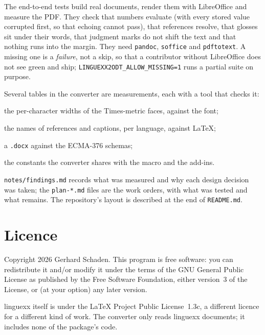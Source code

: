 \documentclass[11pt,a4paper]{article}
\newcommand{\file}[1]{\texttt{#1}}
\newcommand{\pkg}[1]{\textsf{#1}}
\begin{document}
The end-to-end tests build real documents, render them with LibreOffice and
measure the PDF. They check that numbers evaluate (with every stored value
corrupted first, so that echoing cannot pass), that references resolve, that
glosses sit under their words, that judgment marks do not shift the text and
that nothing runs into the margin. They need \texttt{pandoc}, \texttt{soffice}
and \texttt{pdftotext}. A missing one is a \emph{failure}, not a skip, so that
a contributor without LibreOffice does not see green and ship;
\texttt{LINGUEXX2ODT\_ALLOW\_MISSING=1} runs a partial suite on purpose.

Several tables in the converter are measurements, each with a tool that checks
it:
\begin{description}[style=sameline,leftmargin=1.5em,nosep]
\item[\file{tools/measure\_advances.py}] the per-character widths of the
  Times-metric faces, against the font;
\item[\file{tools/measure\_names.py}] the names of references and captions,
  per language, against \LaTeX{};
\item[\file{tools/validate\_docx.py}] a \file{.docx} against the ECMA-376
  schemas;
\item[\file{tools/sync\_macro.py}] the constants the converter shares with the
  macro and the add-ins.
\end{description}
\file{notes/findings.md} records what was measured and why each design
decision was taken; the \file{plan-*.md} files are the work orders, with what
was tested and what remains. The repository's layout is described at the end
of \file{README.md}.

\section*{Licence}

Copyright \textcopyright{} 2026 Gerhard Schaden. This program is free
software: you can redistribute it and/or modify it under the terms of the GNU
General Public License as published by the Free Software Foundation, either
version~3 of the License, or (at your option) any later version.

\pkg{linguexx} itself is under the \LaTeX{} Project Public License~1.3c, a
different licence for a different kind of work. The converter only reads
\pkg{linguexx} documents; it includes none of the package's code.
\end{document}
